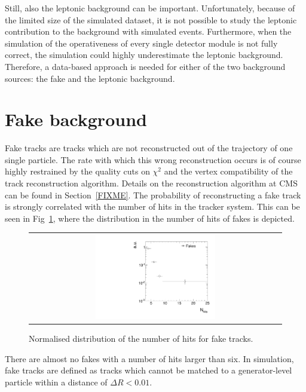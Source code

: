 Still, also the leptonic background can be important.
Unfortunately, because of the limited size of the simulated \WJets dataset, it is not possible to study the leptonic contribution to the background with simulated events.
Furthermore, when the simulation of the operativeness of every single detector module is not fully correct, the simulation could highly underestimate the leptonic background.\\

Therefore, a data-based approach is needed for either of the two background sources: the fake and the leptonic background.
\section{Fake background}
\label{sec:FakeBkg}
Fake tracks are tracks which are not reconstructed out of the trajectory of one single particle.
The rate with which this wrong reconstruction occurs is of course highly restrained by the quality cuts on $\chi^2$ and the vertex compatibility of the track reconstruction algorithm.
Details on the reconstruction algorithm at CMS can be found in Section~\ref{FIXME}.
The probability of reconstructing a fake track is strongly correlated with the number of hits in the tracker system.
This can be seen in Fig~\ref{fig:NValidFakes}, where the distribution in the number of hits of fakes is depicted.
\begin{figure}[!bt]
  \centering 
  \begin{tabular}{c}
    \includegraphics[width=0.49\textwidth]{figures/analysis/NValidForFakes_chiTracksfullSelectionNoQCDCutsNoTrigger_PtGt15GeV.pdf}
  \end{tabular}
  \caption{Normalised distribution of the number of hits for fake tracks.}
  \label{fig:NValidFakes}
\end{figure}
There are almost no fakes with a number of hits larger than six.
In simulation, fake tracks are defined as tracks which cannot be matched to a generator-level particle within a distance of $\Delta R < 0.01$.

